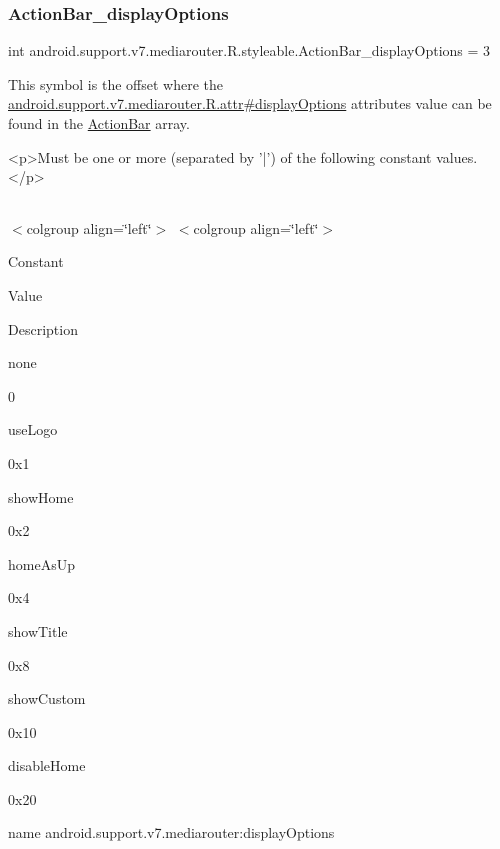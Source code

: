 \subsubsection{\texorpdfstring{Action\+Bar\+\_\+display\+Options}{ActionBar\_displayOptions}}
{\footnotesize\ttfamily int android.\+support.\+v7.\+mediarouter.\+R.\+styleable.\+Action\+Bar\+\_\+display\+Options = 3\hspace{0.3cm}{\ttfamily [static]}}

This symbol is the offset where the \hyperlink{classandroid_1_1support_1_1v7_1_1mediarouter_1_1R_1_1attr_aa8901ce272bac5ae82af0d8a34f9ae05}{android.\+support.\+v7.\+mediarouter.\+R.\+attr\#display\+Options} attribute\textquotesingle{}s value can be found in the \hyperlink{classandroid_1_1support_1_1v7_1_1mediarouter_1_1R_1_1styleable_adc4d3c0d096085367f12d025007aa53f}{Action\+Bar} array.

\begin{DoxyVerb}      <p>Must be one or more (separated by '|') of the following constant values.</p>
\end{DoxyVerb}
 \tabulinesep=1mm
\begin{longtabu} spread 0pt [c]{*{0}{|X[-1]}|}
\hline
\end{longtabu}
$<$colgroup align=\char`\"{}left\char`\"{}$>$ $<$colgroup align=\char`\"{}left\char`\"{}$>$ 

Constant

Value

Description 

{\ttfamily none}

0

{\ttfamily use\+Logo}

0x1

{\ttfamily show\+Home}

0x2

{\ttfamily home\+As\+Up}

0x4

{\ttfamily show\+Title}

0x8

{\ttfamily show\+Custom}

0x10

{\ttfamily disable\+Home}

0x20

name android.\+support.\+v7.\+mediarouter\+:display\+Options \mbox{\label{classandroid_1_1support_1_1v7_1_1mediarouter_1_1R_1_1styleable_a88863e673ee6e3ad8ecda463751ead1c}} 
